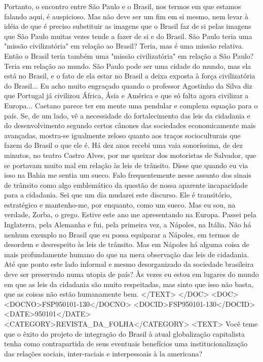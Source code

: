 Portanto, o encontro entre São Paulo e o Brasil, nos termos em que estamos falando aqui, é auspicioso. Mas não deve ser um fim em si mesmo, nem levar à idéia de que é preciso substituir as imagens que o Brasil faz de si pelas imagens que São Paulo muitas vezes tende a fazer de si e do Brasil.
São Paulo teria uma "missão civilizatória" em relação ao Brasil?
Teria, mas é uma missão relativa.
Então o Brasil teria também uma "missão civilizatória" em relação a São Paulo?
Teria em relação ao mundo. São Paulo pode ser uma cidade do mundo, mas ela está no Brasil, e o fato de ela estar no Brasil a deixa exposta à força civilizatória do Brasil... Eu acho muito engraçado quando o professor Agostinho da Silva diz que Portugal já civilizou África, Ásia e América e que só falta agora civilizar a Europa...
Caetano parece ter em mente uma pendular e complexa equação para o país. Se, de um lado, vê a necessidade do fortalecimento das leis da cidadania e do desenvolvimento segundo certos cânones das sociedades economicamente mais avançadas, mostra-se igualmente zeloso quanto aos traços socioculturais que fazem do Brasil o que ele é. 
Há dez anos recebi uma vaia sonoríssima, de dez minutos, no teatro Castro Alves, por me queixar dos motoristas de Salvador, que se portavam muito mal em relação às leis de trânsito. Disse que quando eu via isso na Bahia me sentia um sueco. Falo frequentemente nesse assunto dos sinais de trânsito como algo emblemático da questão de nossa aparente incapacidade para a cidadania. Sei que um dia mudarei este discurso. Ele é transitório, estratégico e mantenho-me, por enquanto, como um sueco.
Mas eu sou, na verdade, Zorba, o grego. Estive este ano me apresentando na Europa. Passei pela Inglaterra, pela Alemanha e fui, pela primeira vez, a Nápoles, na Itália. Não há nenhum exemplo no Brasil que eu possa equiparar a Nápoles, em termos de desordem e desrespeito às leis de trânsito. Mas em Nápoles há alguma coisa de mais profundamente humano do que na mera observação das leis de cidadania.
Até que ponto este lado informal e mesmo desorganizado da sociedade brasileira deve ser preservado numa utopia de país?
Às vezes eu estou em lugares do mundo em que as leis da cidadania são muito respeitadas, mas sinto que isso não basta, que as coisas não estão humanamente bem.
</TEXT>
</DOC>
<DOC>
<DOCNO>FSP950101-130</DOCNO>
<DOCID>FSP950101-130</DOCID>
<DATE>950101</DATE>
<CATEGORY>REVISTA_DA_FOLHA</CATEGORY>
<TEXT>
Você teme que o êxito do projeto de integração do Brasil à atual globalização capitalista tenha como contrapartida de seus eventuais benefícios uma institucionalização das relações sociais, inter-raciais e interpessoais à la americana?
